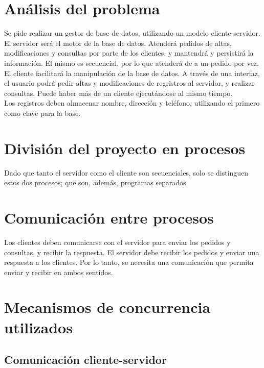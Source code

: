 \documentclass[11pt,spanish,a4paper,openany,notitlepage]{article}
\begin{document}
\newpage
\tableofcontents
\newpage

\section{Análisis del problema}

Se pide realizar un gestor de base de datos, utilizando un modelo cliente-servidor.\\
El servidor será el motor de la base de datos. Atenderá pedidos de altas, modificaciones y consultas por parte de los clientes, y mantendrá y persistirá la información. El mismo es secuencial, por lo que atenderá de a un pedido por vez.\\
El cliente facilitará la manipulación de la base de datos. A través de una interfaz, el usuario podrá pedir altas y modificaciones de regristros al servidor, y realizar consultas. Puede haber más de un cliente ejecutándose al mismo tiempo.\\
Los registros deben almacenar nombre, dirección y teléfono, utilizando el primero como clave para la base.

\section{División del proyecto en procesos}

Dado que tanto el servidor como el cliente son secuenciales, solo se distinguen estos dos procesos; que son, además, programas separados.

\section{Comunicación entre procesos}

Los clientes deben comunicarse con el servidor para enviar los pedidos y consultas, y recibir la respuesta. El servidor debe recibir los pedidos y enviar una respuesta a los clientes. Por lo tanto, se necesita una comunicación que permita enviar y recibir en ambos sentidos.

\section{Mecanismos de concurrencia utilizados}

\subsection{Comunicación cliente-servidor}
\end{document}
